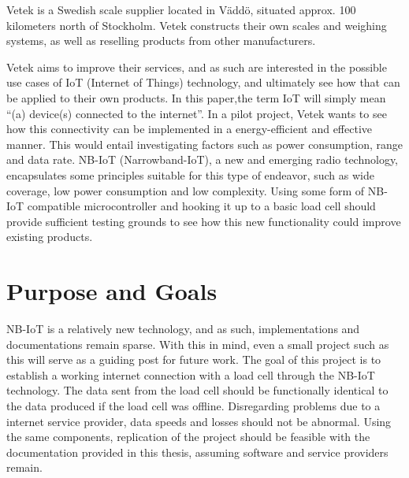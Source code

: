 
Vetek is a Swedish scale supplier located in Väddö, situated approx. 100 kilometers north of Stockholm. Vetek constructs their own scales and weighing systems, as well as reselling products from other manufacturers.\cite{vetek} 

Vetek aims to improve their services, and as such are interested in the possible use cases of IoT (Internet of Things) technology, and ultimately see how that can be applied to their own products. In this paper,the term IoT will simply mean ``(a) device(s) connected to the internet''\cite{what_is_iot}. In a pilot project, Vetek wants to see how this connectivity can be implemented in a energy-efficient and effective manner. This would entail investigating factors such as power consumption, range and data rate. NB-IoT (Narrowband-IoT), a new and emerging radio technology, encapsulates some principles suitable for this type of endeavor, such as wide coverage, low power consumption and low complexity.\cite{NB-overview} Using some form of NB-IoT compatible microcontroller and hooking it up to a basic load cell should provide sufficient testing grounds to see how this new functionality could improve existing products.


\section{Purpose and Goals}
\iffalse
\begin{itemize}
	\item Write about the grand scheme of things
	\item Set the correct expectations
	\item What can I expect to learn if I keep on reading?
	\item What are the success criteria for this work?
	\item How will the work be evaluated?
\end{itemize}
\fi

NB-IoT is a relatively new technology, and as such, implementations and documentations remain sparse. With this in mind, even a small project such as this will serve as a guiding post for future work. The goal of this project is to establish a working internet connection with a load cell through the NB-IoT technology. The data sent from the load cell should be functionally identical to the data produced if the load cell was offline. Disregarding problems due to a internet service provider, data speeds and losses should not be abnormal. Using the same components, replication of the project should be feasible with the documentation provided in this thesis, assuming software and service providers remain.

